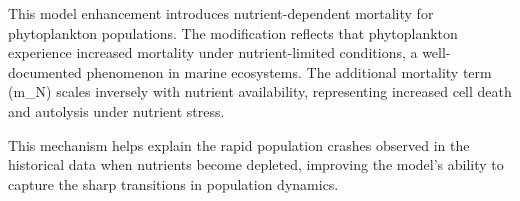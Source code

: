 This model enhancement introduces nutrient-dependent mortality for phytoplankton populations. 
The modification reflects that phytoplankton experience increased mortality under nutrient-limited conditions, 
a well-documented phenomenon in marine ecosystems. The additional mortality term (m_N) scales inversely 
with nutrient availability, representing increased cell death and autolysis under nutrient stress.

This mechanism helps explain the rapid population crashes observed in the historical data when nutrients 
become depleted, improving the model's ability to capture the sharp transitions in population dynamics.
